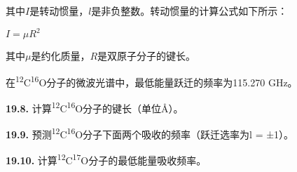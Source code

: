 其中\(I\)是转动惯量，\(l\)是非负整数。转动惯量的计算公式如下所示：

\(I = \mu R^2\)

其中\(\mu\)是约化质量，\(R\)是双原子分子的键长。

在\textsuperscript{12}C\textsuperscript{16}O分子的微波光谱中，最低能量跃迁的频率为115.270
GHz。

\textbf{19.8.}
计算\textsuperscript{12}C\textsuperscript{16}O分子的键长（单位\AA）。

\textbf{19.9.}
预测\textsuperscript{12}C\textsuperscript{16}O分子下面两个吸收的频率（跃迁选率为\Delta l
= ±1）。

\textbf{19.10.}
计算\textsuperscript{12}C\textsuperscript{17}O分子的最低能量吸收频率。
